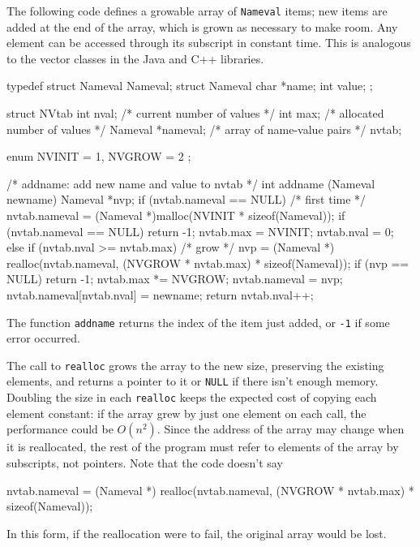 The following code defines a growable array of \verb'Nameval'
items; new items are added at the end of the array, which is grown as
necessary to make room. Any element can be accessed through its subscript
in constant time. This is analogous to the vector classes in the Java and
C++ libraries.
\begin{wellcode}
    typedef struct Nameval Nameval;
    struct Nameval {
        char *name;
        int value;
    };

    struct NVtab {
        int nval;       /* current number of values */
        int max;        /* allocated number of values */
        Nameval *nameval;   /* array of name-value pairs */
    } nvtab;

    enum { NVINIT = 1, NVGROW = 2 };

    /* addname: add new name and value to nvtab */
    int addname (Nameval newname)
    {
        Nameval *nvp;
        if (nvtab.nameval == NULL) {    /* first time */
            nvtab.nameval =
                (Nameval *)malloc(NVINIT * sizeof(Nameval));
            if (nvtab.nameval == NULL)
                return -1;
            nvtab.max = NVINIT;
            nvtab.nval = 0;
        }
        else if (nvtab.nval >= nvtab.max) { /* grow */
            nvp = (Nameval *) realloc(nvtab.nameval,
                        (NVGROW * nvtab.max) * sizeof(Nameval));
            if (nvp == NULL)
                return -1;
            nvtab.max *= NVGROW;
            nvtab.nameval = nvp;
        }
        nvtab.nameval[nvtab.nval] = newname;
        return nvtab.nval++;
    }
\end{wellcode}
The function \verb'addname' returns the index of the item just added, or
\verb'-1' if some error occurred.

The call to \verb'realloc' grows the array to the new size, preserving the
existing elements, and returns a pointer to it or \verb'NULL' if there
isn't enough memory. Doubling the size in each \verb'realloc' keeps the
expected cost of copying each element constant: if the array grew by just
one element on each call, the performance could be $O(n^2)$. Since the
address of the array may change when it is reallocated, the rest of the
program must refer to elements of the array by subscripts, not pointers.
Note that the code doesn't say
\begin{badcode}
    nvtab.nameval = (Nameval *) realloc(nvtab.nameval,
            (NVGROW * nvtab.max) * sizeof(Nameval));
\end{badcode}
In this form, if the reallocation were to fail, the original array would be
lost.

